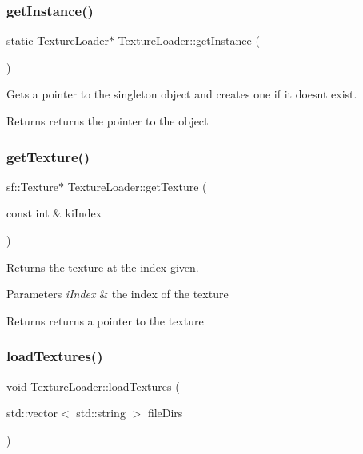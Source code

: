 \subsubsection{\texorpdfstring{get\+Instance()}{getInstance()}}
{\footnotesize\ttfamily static \hyperlink{class_texture_loader}{Texture\+Loader}$\ast$ Texture\+Loader\+::get\+Instance (\begin{DoxyParamCaption}{ }\end{DoxyParamCaption})\hspace{0.3cm}{\ttfamily [static]}}



Gets a pointer to the singleton object and creates one if it doesnt exist. 

\begin{DoxyReturn}{Returns}
returns the pointer to the object 
\end{DoxyReturn}
\mbox{\label{class_texture_loader_a8211d1fc150e9a03ad40226d2691e3f6}} 
\subsubsection{\texorpdfstring{get\+Texture()}{getTexture()}}
{\footnotesize\ttfamily sf\+::\+Texture$\ast$ Texture\+Loader\+::get\+Texture (\begin{DoxyParamCaption}\item[{const int \&}]{ki\+Index }\end{DoxyParamCaption})}



Returns the texture at the index given. 


\begin{DoxyParams}{Parameters}
{\em i\+Index} & the index of the texture \\
\hline
\end{DoxyParams}
\begin{DoxyReturn}{Returns}
returns a pointer to the texture 
\end{DoxyReturn}
\mbox{\label{class_texture_loader_a2f267ecbe1370943f3e42a52dbe902fd}} 
\subsubsection{\texorpdfstring{load\+Textures()}{loadTextures()}}
{\footnotesize\ttfamily void Texture\+Loader\+::load\+Textures (\begin{DoxyParamCaption}\item[{std\+::vector$<$ std\+::string $>$}]{file\+Dirs }\end{DoxyParamCaption})}



